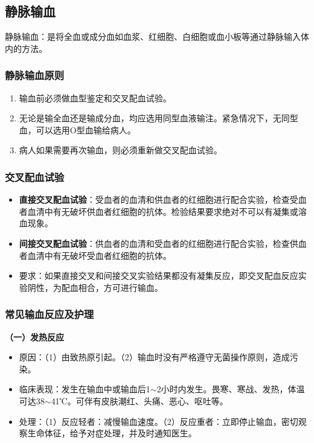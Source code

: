 \documentclass[11pt, a4paper]{ctexart}
\begin{document}
\subsection{静脉输血}
静脉输血：是将全血或成分血如血浆、红细胞、白细胞或血小板等通过静脉输入体内的方法。

\subsubsection{静脉输血原则}
\begin{enumerate}
	\item 输血前必须做血型鉴定和交叉配血试验。
	\item 无论是输全血还是输成分血，均应选用同型血液输注。紧急情况下，无同型血，可以选用O型血输给病人。
	\item 病人如果需要再次输血，则必须重新做交叉配血试验。
\end{enumerate}

\subsubsection{交叉配血试验}
\begin{itemize}
	\item \textbf{直接交叉配血试验}：受血者的血清和供血者的红细胞进行配合实验，检查受血者血清中有无破坏供血者红细胞的抗体。检验结果要求绝对不可以有凝集或溶血现象。
	\item \textbf{间接交叉配血试验}：供血者的血清和受血者的红细胞进行配合实验，检查供血者血清中有无破坏受血者红细胞的抗体。
	\item 要求：如果直接交叉和间接交叉实验结果都没有凝集反应，即交叉配血反应实验阴性，为配血相合，方可进行输血。
\end{itemize}

\subsubsection{常见输血反应及护理}
\textbf{（一）发热反应}
\begin{itemize}
	\item 原因：（1）由致热原引起。（2）输血时没有严格遵守无菌操作原则，造成污染。
	\item 临床表现：发生在输血中或输血后1$\sim$2小时内发生。畏寒、寒战、发热，体温可达38$\sim$41℃。可伴有皮肤潮红、头痛、恶心、呕吐等。
	\item 处理：（1）反应轻者：减慢输血速度。（2）反应重者：立即停止输血，密切观察生命体征，给予对症处理，并及时通知医生。
\end{itemize}
\end{document}
